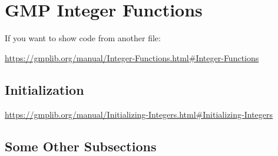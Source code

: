 \section{GMP Integer Functions}

If you want to show code from another file:
\codes{}

\url{https://gmplib.org/manual/Integer-Functions.html#Integer-Functions}


\subsection{Initialization}

\url{https://gmplib.org/manual/Initializing-Integers.html#Initializing-Integers}


\subsection{Some Other Subsections}
